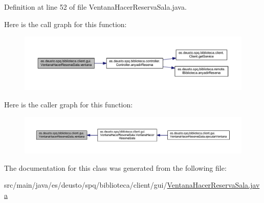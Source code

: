 Definition at line 52 of file Ventana\+Hacer\+Reserva\+Sala.\+java.

Here is the call graph for this function\+:
\nopagebreak
\begin{figure}[H]
\begin{center}
\leavevmode
\includegraphics[width=350pt]{classes_1_1deusto_1_1spq_1_1biblioteca_1_1client_1_1gui_1_1_ventana_hacer_reserva_sala_aa5d6c1cf5f1017a242410ad04c5cc876_cgraph}
\end{center}
\end{figure}
Here is the caller graph for this function\+:
\nopagebreak
\begin{figure}[H]
\begin{center}
\leavevmode
\includegraphics[width=350pt]{classes_1_1deusto_1_1spq_1_1biblioteca_1_1client_1_1gui_1_1_ventana_hacer_reserva_sala_aa5d6c1cf5f1017a242410ad04c5cc876_icgraph}
\end{center}
\end{figure}


The documentation for this class was generated from the following file\+:\begin{DoxyCompactItemize}
\item 
src/main/java/es/deusto/spq/biblioteca/client/gui/\mbox{\hyperlink{_ventana_hacer_reserva_sala_8java}{Ventana\+Hacer\+Reserva\+Sala.\+java}}\end{DoxyCompactItemize}
